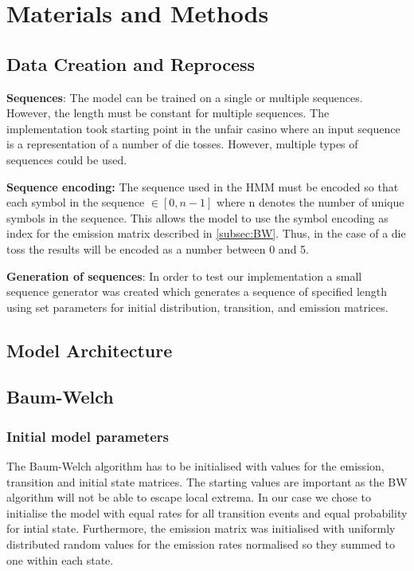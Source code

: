 
\section{Materials and Methods}

\subsection{Data Creation and Reprocess}

\textbf{Sequences}:  The model can be trained on a single or multiple sequences. However, the length must be constant for multiple sequences. The implementation took starting point in the unfair casino where an input sequence is a representation of a number of die tosses. However, multiple types of sequences could be used.

\noindent
\textbf{Sequence encoding:} The sequence used in the HMM must be encoded so that each symbol in the sequence $\in [0,n-1]$ where n denotes the number of unique symbols in the sequence. This allows the model to use the symbol encoding as index for the emission matrix described in \autoref{subsec:BW}. Thus, in the case of a die toss the results will be encoded as a number between 0 and 5.

\textbf{Generation of sequences}: In order to test our implementation a small sequence generator was created which generates a sequence of specified length using set parameters for initial distribution, transition, and emission matrices.

\subsection{Model Architecture} 



\subsection{Baum-Welch} \label{subsec:BW}


\subsubsection{Initial model parameters}
The Baum-Welch algorithm has to be initialised with values for the emission, transition and initial state matrices. The starting values are important as the BW algorithm will not be able to escape local extrema. In our case we chose to initialise the model with equal rates for all transition events and equal probability for intial state. Furthermore, the emission matrix was initialised with uniformly distributed random values for the emission rates normalised so they summed to one within each state. 

